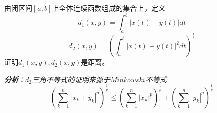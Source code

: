 \begin{mdframed}
    \begin{question}
        由闭区间$[a,b]$上全体连续函数组成的集合上，定义
        \begin{equation}
            d_1(x,y)=\int_{a}^{b}\left|x(t)-y(t)\right|dt
        \end{equation}
        \begin{equation}
            d_2(x,y)=(\int_{a}^{b}\left|x(t)-y(t)\right|^2dt)^\frac{1}{2}
        \end{equation}
        证明$d_1(x,y),d_2(x,y)$是距离。
    \end{question}
\end{mdframed}

\textsl{\textbf{分析}：$d_2$三角不等式的证明来源于$Minkowski$不等式}
\begin{equation}
    \left(\sum_{k=1}^{n}|x_k+y_k|^p\right)^{\frac{1}{p}}\leqslant  \left(\sum_{k=1}^{n}|x_k|^p\right)^{\frac{1}{p}}+ \left(\sum_{k=1}^{n}|y_k|^p\right)^{\frac{1}{p}}
\end{equation}

